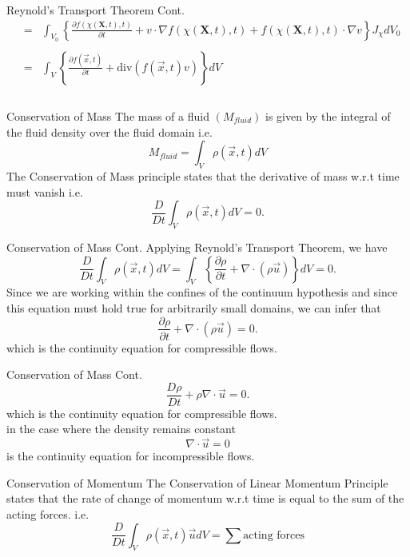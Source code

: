 \documentclass[frames]{prosper}
\begin{document}
\begin{slide}[Box]{Reynold's Transport Theorem Cont.}
\begin{eqnarray*}
 &=& \int_{V_{0}}\left\{\frac{\partial f(\chi(\textbf{X},t),t)}{\partial t} + v\cdot \nabla f(\chi(\textbf{X},t),t) + f(\chi(\textbf{X},t),t)\cdot \nabla v\right\}J_{\chi}dV_{0}\\ \\
 &=& \int_{V}\left\{\frac{\partial f(\stackrel{\rightarrow}{x},t)}{\partial t} + \mbox{div}(f(\stackrel{\rightarrow}{x},t)v)\right\}dV\\ \\
\end{eqnarray*}
\end{slide}

\begin{slide}[Box]{Conservation of Mass}
The mass of a fluid $(M_{fluid})$ is given by the integral of the fluid density over the fluid domain i.e. $$ M_{fluid} = \int_{V} \rho(\stackrel{\rightarrow}{x},t)dV $$
The Conservation of Mass principle states that the derivative of mass w.r.t time must vanish i.e. $$ \frac{D}{Dt} \int_{V} \rho(\stackrel{\rightarrow}{x},t)dV = 0. $$
\end{slide}

\begin{slide}[Split]{Conservation of Mass Cont.}
Applying Reynold's Transport Theorem, we have $$ \frac{D}{Dt} \int_{V} \rho(\stackrel{\rightarrow}{x},t)dV = \int_{V} \left\{\frac{\partial \rho}{\partial t} + \nabla \cdot(\rho \stackrel{\rightarrow}{u})\right\}dV = 0. $$ Since we are working within the confines of the continuum hypothesis and since this equation must hold true for arbitrarily small domains, we can infer that $$ \frac{\partial \rho}{\partial t} + \nabla \cdot(\rho \stackrel{\rightarrow}{u}) = 0.$$ which is the continuity equation for compressible flows.
\end{slide}

\begin{slide}[Dissolve]{Conservation of Mass Cont.}
$$\frac{D\rho}{Dt} + \rho \nabla \cdot \stackrel{\rightarrow}{u} = 0.$$
which is the continuity equation for compressible flows.\\
in the case where the density remains constant $$\nabla \cdot \stackrel{\rightarrow}{u} = 0$$
is the continuity equation for incompressible flows.
\end{slide}



\begin{slide}[Dissolve]{Conservation of Momentum}
The Conservation of Linear Momentum Principle states that the rate of change of momentum w.r.t time is equal to the sum of the acting forces.
i.e.
$$ \frac{D}{Dt} \int_{V} \rho(\stackrel{\rightarrow}{x},t) \stackrel{\rightarrow}{u}dV = \sum \mbox{acting forces}$$
\end{slide}
\end{document}
